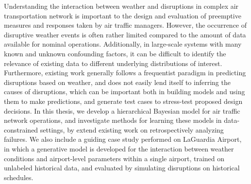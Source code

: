 %
%


Understanding the interaction between weather and disruptions in complex air transportation network is important to the design and evaluation of preemptive measures and responses taken by air traffic managers. However, the occurrence of disruptive weather events is often rather limited compared to the amount of data available for nominal operations.  Additionally, in large-scale systems with many known and unknown confounding factors, it can be difficult to identify the relevance of existing data to different underlying distributions of interest. Furthermore, existing work generally follows a frequentist paradigm in predicting disruptions based on weather, and does not easily lend itself to inferring the causes of disruptions, which can be important both in building models and using them to make predictions, and generate test cases to stress-test proposed design decisions. In this thesis, we develop a hierarchical Bayesian model for air traffic network operations, and investigate methods for learning these models in data-constrained settings, by extend existing work on retrospectively analyzing failures. We also include a guiding case study performed on LaGuardia Airport, in which a generative model is developed for the interaction between weather conditions and airport-level parameters within a single airport, trained on unlabeled historical data, and evaluated by simulating disruptions on historical schedules. 

